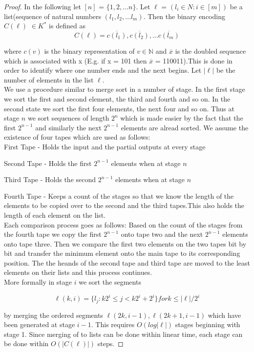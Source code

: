 \documentclass[english]{article}
\theoremstyle{plain}
\theoremstyle{definition}
\theoremstyle{plain}
\begin{document}
\begin{proof}
In the following let $[n]$ = $\{1,2,\ldots n\}$. Let $\ell$ = $(l_i \in N: i \in [m])$ be a list(sequence of natural numbers $(l_1,l_2, \ldots l_m)$. Then the binary encoding $C(\ell)$ $\in K^*$ is defined as
\[
C(\ell) = \overline{c(l_1)},\overline{c(l_2)}, \ldots \overline{c(l_m)}
\]

where $c(v)$ is the binary representation of $v \in \mathbb{N}$ and $\overline{x}$ is the doubled sequence which is associated with x (E.g. if x = 101 then $\overline{x}$ = 110011).This is done in order to identify where one number ends and the next begins. Let $|\ell|$ be the number of elements in the list $\ell$.\\

We use a procedure similar to merge sort in a number of stage. In the first stage we sort the first and second element, the third and fourth and so on. In the second state we sort the first four elements, the next four and so on. Thus at stage $n$ we sort sequences of length $2^n$ which is made easier by the fact that the first $2^{n-1}$ and similarly the next $2^{n-1}$ elements are alread sorted. We assume the existence of four tapes which are used as follows:\\

First Tape - Holds the input and the partial outputs at every stage

Second Tape - Holds the first $2^{n-1}$ elements when at stage $n$

Third Tape - Holds the second $2^{n-1}$ elements when at stage $n$

Fourth Tape - Keeps a count of the stages so that we know the length of the elements to be copied over to the second and the third tapes.This also holds the length of each element on the list.\\

Each comparison process goes as follows: Based on the count of the stages from the fourth tape we copy the first $2^{n-1}$ onto tape two and the next $2^{n-1}$ elements onto tape three. Then we compare the first two elements on the two tapes bit by bit and transfer the minimum element onto the main tape to its corresponding position. The the heands of the second tape and third tape are moved to the least elements on their lists and this process continues.\\

More formally in stage $i$ we sort the segments

\[
\ell(k,i) = \{l_j: k2^i \leq j < k2^i + 2^i\} for k \leq |\ell|/2^i
\]

by merging the ordered segments $\ell(2k,i - 1),\ell(2k + 1,i - 1)$ which have been generated at stage $i - 1$. This requires $O(log |\ell|)$ stages beginning with stage 1. Since merging of to lists can be done within linear time, each stage can be done within $O(|C(\ell)|)$ steps.
\end{proof}
\end{document}

